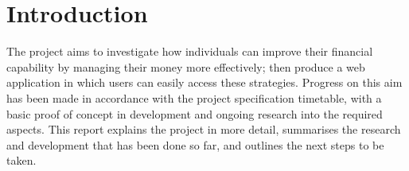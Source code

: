 \section{Introduction}

The project aims to investigate how individuals can improve their financial capability by managing their money more effectively; then produce a web application in which users can easily access these strategies. Progress on this aim has been made in accordance with the project specification timetable, with a basic proof of concept in development and ongoing research into the required aspects. This report explains the project in more detail, summarises the research and development that has been done so far, and outlines the next steps to be taken.